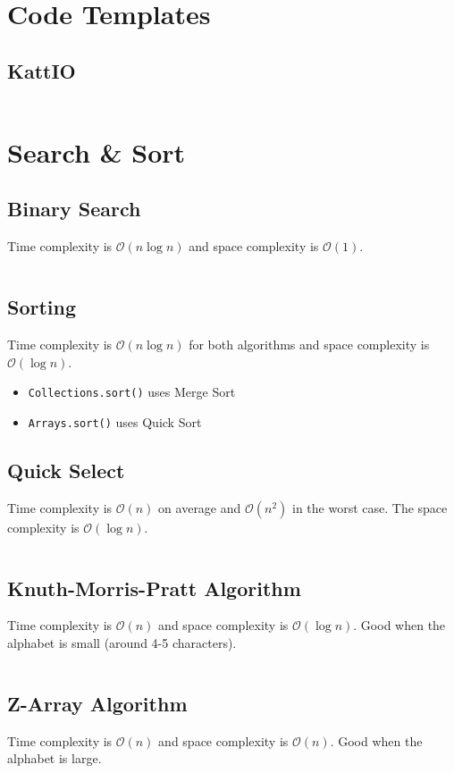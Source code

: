 \documentclass[8pt,a4paper,landscape,oneside]{amsart}
\newcommand{\code}[1]{\inputminted[fontsize=\normalsize,baselinestretch=1]{java}{code/#1}}
\newcommand{\bigO}{\mathcal{O}}
\begin{document}
\begin{multicols*}{3}
\section{Code Templates}
  \subsection{KattIO}
  \code{Kattio.java}
  
  
\section{Search \& Sort}
  \subsection{Binary Search}
  Time complexity is $\bigO(n \log n)$ and space complexity is $\bigO(1)$.
  \code{Structures/BinarySearch.java}
  
  \subsection{Sorting}
  Time complexity is $\bigO(n \log n)$ for both algorithms and space complexity is $\bigO(\log n)$.
  \begin{itemize}
  \item \texttt{Collections.sort()} uses Merge Sort
  \item \texttt{Arrays.sort()} uses Quick Sort
  \end{itemize}
  
  \subsection{Quick Select}
  Time complexity is $\bigO(n)$ on average and $\bigO(n^2)$ in the worst case. The space complexity is $\bigO(\log n)$.
  \code{Structures/QuickSelect.java}
  
  \subsection{Knuth-Morris-Pratt Algorithm}
  Time complexity is $\bigO(n)$ and space complexity is $\bigO(\log n)$. Good when the alphabet is small (around 4-5 characters).
  \code{Structures/KMP.java}
  
  \subsection{Z-Array Algorithm}
  Time complexity is $\bigO(n)$ and space complexity is $\bigO(n)$. Good when the alphabet is large.
  \code{Structures/ZArray.java}
  

\end{multicols*}
\end{document}
